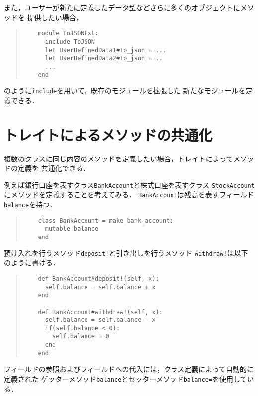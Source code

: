 \documentclass[a4paper,11pt,dvipdfmx]{jreport}
\begin{document}
また，ユーザーが新たに定義したデータ型などさらに多くのオブジェクトにメソッドを
提供したい場合，
\begin{quote}
	\begin{verbatim}
	module ToJSONExt:
	  include ToJSON
	  let UserDefinedData1#to_json = ...
	  let UserDefinedData2#to_json = ..
	  ...
	end
	\end{verbatim}
\end{quote}
のように\verb|include|を用いて，既存のモジュールを拡張した
新たなモジュールを定義できる．


\section{トレイトによるメソッドの共通化}
\label{section:traits}

複数のクラスに同じ内容のメソッドを定義したい場合，トレイトによってメソッドの定義を
共通化できる．

例えば銀行口座を表すクラス\verb|BankAccount|と株式口座を表すクラス
\verb|StockAccount|にメソッドを定義することを考えてみる．
\verb|BankAccount|は残高を表すフィールド\verb|balance|を持つ．
\begin{quote}
	\begin{verbatim}
	class BankAccount = make_bank_account:
	  mutable balance
	end
	\end{verbatim}
\end{quote}
預け入れを行うメソッド\verb|deposit!|と引き出しを行うメソッド
\verb|withdraw!|は以下のように書ける．
\begin{quote}
	\begin{verbatim}
	def BankAccount#deposit!(self, x):
	  self.balance = self.balance + x
	end
	
	def BankAccount#withdraw!(self, x):
	  self.balance = self.balance - x
	  if(self.balance < 0):
	    self.balance = 0
	  end
	end
	\end{verbatim}
\end{quote}
フィールドの参照およびフィールドへの代入には，クラス定義によって自動的に定義された
ゲッターメソッド\verb|balance|とセッターメソッド\verb|balance=|を使用している．
\end{document}
